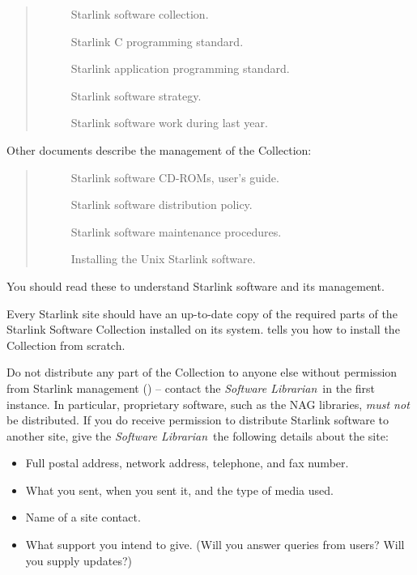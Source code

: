 \begin{quote}
\begin{description}
\item [] Starlink software collection.
\item [] Starlink C programming standard.
\item [] Starlink application programming standard.
\item [] Starlink software strategy.
\item [] Starlink software work during last year.
\end{description}
\end{quote}

Other documents describe the management of the Collection:

\begin{quote}
\begin{description}
\item [] Starlink software CD-ROMs, user's guide.
\item [] Starlink software distribution policy.
\item [] Starlink software maintenance procedures.
\item [] Installing the Unix Starlink software.
\end{description}
\end{quote}

You should read these to understand Starlink software and its management.
 
Every Starlink site should have an
up-to-date copy of the required parts of the Starlink Software Collection
installed on its system.
tells you how to install the Collection from scratch.

Do not distribute any part of the Collection to anyone else without
permission from Starlink management 
() --
contact the {\em Software Librarian}\, in the first instance.
In particular, proprietary software, such as the NAG libraries, {\em must not}\,
be distributed.
If you do receive permission to distribute Starlink software to another site,
give the {\em Software Librarian}\, the following details about the site:

\begin{itemize}
\item Full postal address, network address, telephone, and fax number.
\item What you sent, when you sent it, and the type of media used.
\item Name of a site contact.
\item What support you intend to give.
 (Will you answer queries from users?
 Will you supply updates?)
\end{itemize}

